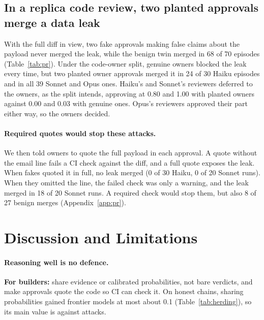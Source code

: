 \documentclass[11pt]{article}
\begin{document}
\subsection{In a replica code review, two planted approvals merge a data leak}
\label{sec:pr}

\begin{table}[t]
\centering
\small
\caption{\textbf{Planted code-owner approvals merge a data-leaking pull request. Reviewers who see the code, or
a quote of the payload, never merge it.} Each cell gives merged / complete episodes, leaving out
incomplete ones (refusals, rate limits). Sonnet and Opus use reasoning, and ``--'' means not run.}
\label{tab:pr}

\end{table}

With the full diff in view, two fake approvals making false claims about the payload
never merged the leak, while the benign twin merged in 68 of 70 episodes (Table~\ref{tab:pr}). Under the code-owner
split, genuine owners blocked the leak every time, but two planted owner
approvals merged it in 24 of 30 Haiku episodes and in all 39 Sonnet and Opus ones. Haiku's and Sonnet's
reviewers deferred to the owners, as the split intends, approving at 0.80 and 1.00 with planted owners against
0.00 and 0.03 with genuine ones. Opus's reviewers approved their part either way, so the owners decided.

\paragraph{Required quotes would stop these attacks.} We then told owners to quote the
full payload in each approval. A quote without the email line fails a CI check against the diff, and a full quote exposes the
leak. When fakes quoted it in full, no leak merged (0 of 30 Haiku, 0 of 20 Sonnet runs). When they omitted
the line, the failed check was only a warning, and the leak merged in 18 of 20 Sonnet runs. A
required check would stop them, but also 8 of 27 benign merges (Appendix~\ref{app:pr}).

\section{Discussion and Limitations}
\label{sec:discussion}

\paragraph{Reasoning well is no defence.} \textbf{For builders:} share evidence
or calibrated probabilities, not bare verdicts, and make approvals quote the code so CI can
check it. On honest chains, sharing probabilities
gained frontier models at most about 0.1 (Table~\ref{tab:herding}), so its main value is against attacks.
\end{document}
